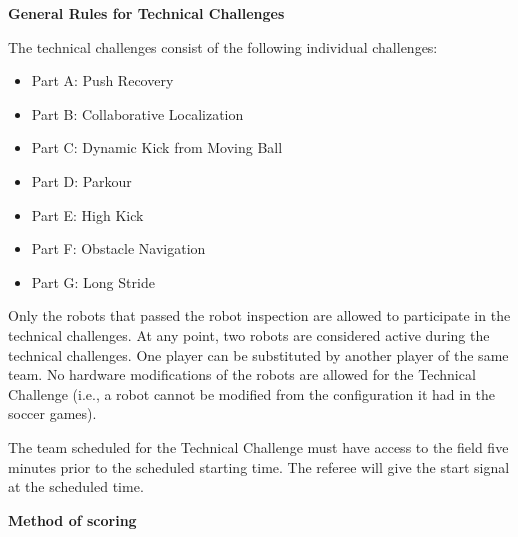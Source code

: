 \clearpage
\sffamily
{\bfseries\color[rgb]{0.4,0.4,0.4}
General Rules for Technical Challenges}
{}

\bigskip

The technical challenges consist of the following individual challenges:

\begin{itemize}
\item Part A: Push Recovery 
\item Part B: Collaborative Localization 
\item Part C: Dynamic Kick from Moving Ball
\item Part D: Parkour
\item Part E: High Kick
\item Part F: Obstacle Navigation
\item Part G: Long Stride
\end{itemize}

\bigskip

Only the robots that passed the robot inspection are allowed to participate in the technical challenges.
At any point, two robots are considered active during the technical challenges.
One player can be substituted by another player of the same team.
No hardware modifications of the robots are allowed for the Technical Challenge
(i.e., a robot cannot be modified from the configuration it had in the soccer games). 

\bigskip

The team scheduled for the Technical Challenge must have access to the field five minutes prior to the scheduled starting time. The referee will give the start signal at the scheduled time.

\bigskip
{}

\bigskip

{\bfseries Method of scoring}

\headlinebox
 
